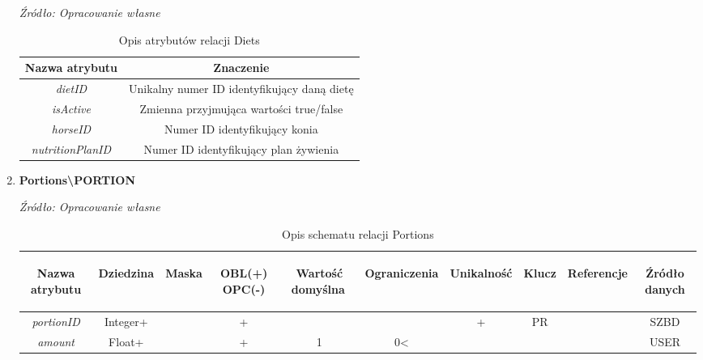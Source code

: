 \documentclass[12pt,oneside]{report}
\begin{document}
\begin{enumerate}[start=1,label={\bfseries REL\textbackslash0\arabic*}]
\begin{table}[H]
	\caption{Opis atrybutów relacji Diets}
	\textit{Źródło: Opracowanie własne}
	\label{DietsAttributeDescription}
	\centering
	\begin{tabular}{|c|c|}
		\hline
		Nazwa atrybutu & Znaczenie \\
				\hline
		\textit{dietID}& Unikalny numer ID identyfikujący daną dietę\\
		\hline
		\textit{isActive}& Zmienna przyjmująca wartości true/false \\
		\hline
		\textit{horseID}& Numer ID identyfikujący konia\\
		\hline
		\textit{nutritionPlanID}& Numer ID identyfikujący plan żywienia\\
		\hline
	\end{tabular}
\end{table}
\item \textbf{Portions\textbackslash PORTION} 
\begin{table}[H]
	\caption{Opis schematu relacji Portions}
	\textit{Źródło: Opracowanie własne}
	\label{PortionsRelationSchema}
	\centering
	\begin{tabular}{|c|c|c|c|c|c|c|c|c|c|}
		\hline
		\begin{sideways}Nazwa atrybutu\end{sideways}& 
		\begin{sideways}Dziedzina \end{sideways}& 
		\begin{sideways}Maska \end{sideways}& 
		\begin{sideways}OBL(+) OPC(-)\end{sideways} & 
		\begin{sideways}Wartość domyślna$\ $\end{sideways}& 
		\begin{sideways}Ograniczenia\end{sideways} &
		\begin{sideways}Unikalność \end{sideways}& 
		\begin{sideways}Klucz \end{sideways}& 
		\begin{sideways}Referencje \end{sideways}&
		\begin{sideways}Źródło danych\end{sideways}\\
		\hline
		\textit{portionID}&Integer+&&+&&&+&PR&&SZBD\\		
		\hline
		\textit{amount}&Float+&&+&1&0<&&&&USER\\
		\hline
	\end{tabular}
\end{table}


\end{enumerate}
\end{document}

